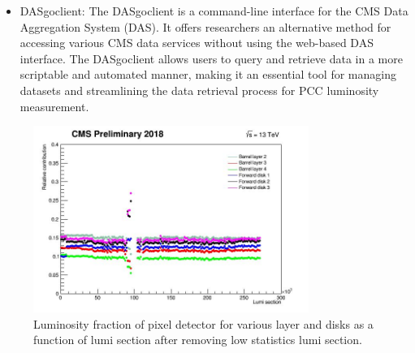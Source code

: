 \begin{itemize}
\item DASgoclient: The DASgoclient is a command-line interface for the CMS Data Aggregation System (DAS). It offers researchers an alternative method for accessing various CMS data services without using the web-based DAS interface. The DASgoclient allows users to query and retrieve data in a more scriptable and automated manner, making it an essential tool for managing datasets and streamlining the data retrieval process for PCC luminosity measurement.

\end{itemize}








\begin{figure}[!htp]
\centering
\includegraphics[width=0.8\textwidth]{ashish_thesis/pixel_layer_disk_noveto.png}
\caption{%
   Luminosity fraction of pixel detector for various layer and disks as a function of lumi section after removing low statistics lumi section.
}
\label{fig:PCC_stab_begin}
\end{figure}



